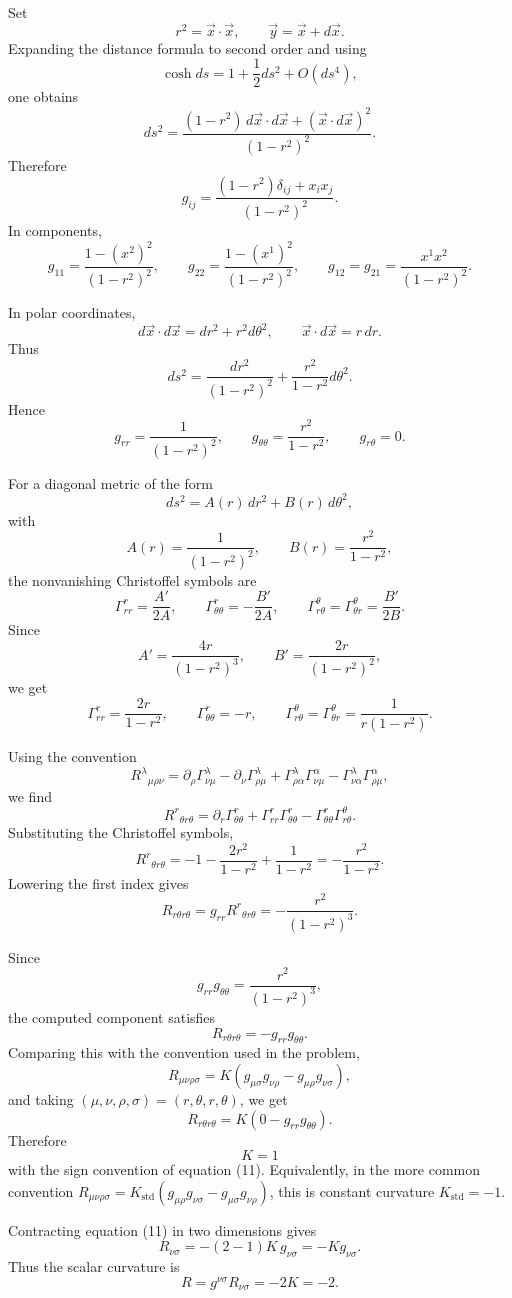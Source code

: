\begin{solution}
Set
\[
    r^2=\vec x\cdot\vec x,
    \qquad
    \vec y=\vec x+d\vec x.
\]
Expanding the distance formula to second order and using
\[
    \cosh ds=1+\frac{1}{2}ds^2+O(ds^4),
\]
one obtains
\[
    ds^2
    =
    \frac{(1-r^2)\,d\vec x\cdot d\vec x+(\vec x\cdot d\vec x)^2}{(1-r^2)^2}.
\]
Therefore
\[
    g_{ij}
    =
    \frac{(1-r^2)\delta_{ij}+x_ix_j}{(1-r^2)^2}.
\]
In components,
\[
    g_{11}
    =
    \frac{1-(x^2)^2}{(1-r^2)^2},
    \qquad
    g_{22}
    =
    \frac{1-(x^1)^2}{(1-r^2)^2},
    \qquad
    g_{12}=g_{21}
    =
    \frac{x^1x^2}{(1-r^2)^2}.
\]

In polar coordinates,
\[
    d\vec x\cdot d\vec x=dr^2+r^2d\theta^2,
    \qquad
    \vec x\cdot d\vec x=r\,dr.
\]
Thus
\[
    ds^2
    =
    \frac{dr^2}{(1-r^2)^2}
    +\frac{r^2}{1-r^2}d\theta^2.
\]
Hence
\[
    g_{rr}=\frac{1}{(1-r^2)^2},
    \qquad
    g_{\theta\theta}=\frac{r^2}{1-r^2},
    \qquad
    g_{r\theta}=0.
\]

For a diagonal metric of the form
\[
    ds^2=A(r)\,dr^2+B(r)\,d\theta^2,
\]
with
\[
    A(r)=\frac{1}{(1-r^2)^2},
    \qquad
    B(r)=\frac{r^2}{1-r^2},
\]
the nonvanishing Christoffel symbols are
\[
    \Gamma^r_{rr}=\frac{A'}{2A},
    \qquad
    \Gamma^r_{\theta\theta}=-\frac{B'}{2A},
    \qquad
    \Gamma^\theta_{r\theta}=\Gamma^\theta_{\theta r}=\frac{B'}{2B}.
\]
Since
\[
    A'=\frac{4r}{(1-r^2)^3},
    \qquad
    B'=\frac{2r}{(1-r^2)^2},
\]
we get
\[
    \Gamma^r_{rr}=\frac{2r}{1-r^2},
    \qquad
    \Gamma^r_{\theta\theta}=-r,
    \qquad
    \Gamma^\theta_{r\theta}=\Gamma^\theta_{\theta r}
    =\frac{1}{r(1-r^2)}.
\]

Using the convention
\[
    R^\lambda{}_{\mu\rho\nu}
    =
    \partial_\rho\Gamma^\lambda_{\nu\mu}
    -\partial_\nu\Gamma^\lambda_{\rho\mu}
    +\Gamma^\lambda_{\rho\alpha}\Gamma^\alpha_{\nu\mu}
    -\Gamma^\lambda_{\nu\alpha}\Gamma^\alpha_{\rho\mu},
\]
we find
\[
    R^r{}_{\theta r\theta}
    =
    \partial_r\Gamma^r_{\theta\theta}
    +\Gamma^r_{rr}\Gamma^r_{\theta\theta}
    -\Gamma^r_{\theta\theta}\Gamma^\theta_{r\theta}.
\]
Substituting the Christoffel symbols,
\[
    R^r{}_{\theta r\theta}
    =
    -1-\frac{2r^2}{1-r^2}+\frac{1}{1-r^2}
    =
    -\frac{r^2}{1-r^2}.
\]
Lowering the first index gives
\[
    R_{r\theta r\theta}
    =
    g_{rr}R^r{}_{\theta r\theta}
    =
    -\frac{r^2}{(1-r^2)^3}.
\]

Since
\[
    g_{rr}g_{\theta\theta}
    =
    \frac{r^2}{(1-r^2)^3},
\]
the computed component satisfies
\[
    R_{r\theta r\theta}
    =
    -g_{rr}g_{\theta\theta}.
\]
Comparing this with the convention used in the problem,
\[
    R_{\mu\nu\rho\sigma}
    =
    K(g_{\mu\sigma}g_{\nu\rho}-g_{\mu\rho}g_{\nu\sigma}),
\]
and taking $(\mu,\nu,\rho,\sigma)=(r,\theta,r,\theta)$, we get
\[
    R_{r\theta r\theta}
    =
    K(0-g_{rr}g_{\theta\theta}).
\]
Therefore
\[
    K=1
\]
with the sign convention of equation (11). Equivalently, in the more common convention
$R_{\mu\nu\rho\sigma}=K_{\mathrm{std}}(g_{\mu\rho}g_{\nu\sigma}-g_{\mu\sigma}g_{\nu\rho})$, this is constant curvature $K_{\mathrm{std}}=-1$.

Contracting equation (11) in two dimensions gives
\[
    R_{\nu\sigma}=-(2-1)K\,g_{\nu\sigma}=-K g_{\nu\sigma}.
\]
Thus the scalar curvature is
\[
    R=g^{\nu\sigma}R_{\nu\sigma}=-2K=-2.
\]
\end{solution}

